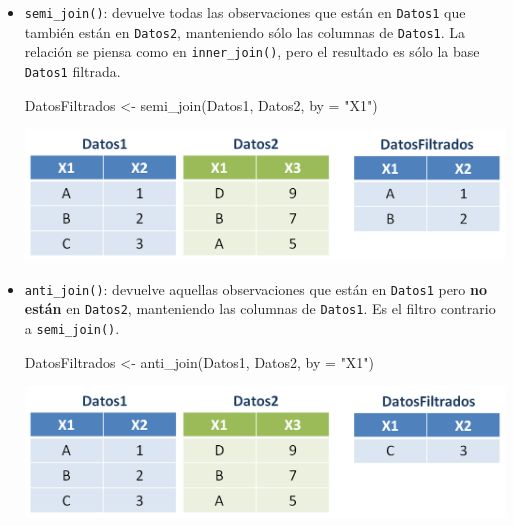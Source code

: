 \documentclass[
]{book}
\newenvironment{Shaded}{\begin{snugshade}}{\end{snugshade}}
\newcommand{\AttributeTok}[1]{\textcolor[rgb]{0.77,0.63,0.00}{#1}}
\newcommand{\FunctionTok}[1]{\textcolor[rgb]{0.00,0.00,0.00}{#1}}
\newcommand{\NormalTok}[1]{#1}
\newcommand{\OtherTok}[1]{\textcolor[rgb]{0.56,0.35,0.01}{#1}}
\newcommand{\StringTok}[1]{\textcolor[rgb]{0.31,0.60,0.02}{#1}}
\begin{document}
\begin{itemize}
\item
  \texttt{semi\_join()}: devuelve todas las observaciones que están en \texttt{Datos1} que también están en \texttt{Datos2}, manteniendo sólo las columnas de \texttt{Datos1}. La relación se piensa como en \texttt{inner\_join()}, pero el resultado es sólo la base \texttt{Datos1} filtrada.

\begin{Shaded}
\begin{Highlighting}[]
\NormalTok{DatosFiltrados }\OtherTok{\textless{}{-}} \FunctionTok{semi\_join}\NormalTok{(Datos1, Datos2, }\AttributeTok{by =} \StringTok{"X1"}\NormalTok{)}
\end{Highlighting}
\end{Shaded}

  \begin{center}\includegraphics[width=0.7\linewidth]{images/06_archivos/semijoin} \end{center}
\item
  \texttt{anti\_join()}: devuelve aquellas observaciones que están en \texttt{Datos1} pero \textbf{no están} en \texttt{Datos2}, manteniendo las columnas de \texttt{Datos1}. Es el filtro contrario a \texttt{semi\_join()}.

\begin{Shaded}
\begin{Highlighting}[]
\NormalTok{DatosFiltrados }\OtherTok{\textless{}{-}} \FunctionTok{anti\_join}\NormalTok{(Datos1, Datos2, }\AttributeTok{by =} \StringTok{"X1"}\NormalTok{)}
\end{Highlighting}
\end{Shaded}

  \begin{center}\includegraphics[width=0.7\linewidth]{images/06_archivos/antijoin} \end{center}
\end{itemize}
\end{document}
